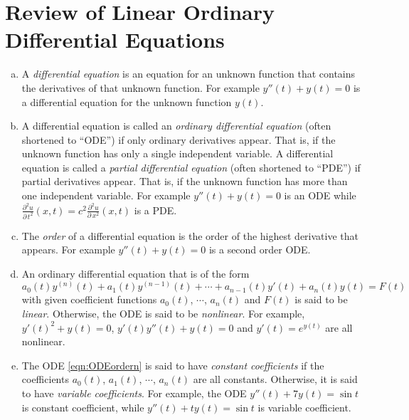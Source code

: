 \graphicspath{{figures/ode/}}

\renewcommand{\theequation}{\thechapter.\arabic{equation}}
\renewcommand{\thetheorem}{\thechapter.\arabic{theorem}}
\renewcommand{\thebc}{\thechapter.\arabic{theorem}}
\renewcommand{\theeg}{\thechapter.\arabic{theorem}}


\chapter{Review of Linear Ordinary Differential Equations}\label{ap:ODE}


\begin{defn}\label{def:apODE}
\begin{enumerate}[(a)]
\item %
A \emph{differential equation} is an equation for an
unknown function that contains the derivatives of that unknown function.
For example $y''(t)+y(t)=0$ is a differential equation for the unknown 
function $y(t)$.

\item %
A differential equation is called an \emph{ordinary differential
equation} (often shortened to ``ODE'') if only ordinary derivatives 
appear. That is, if the unknown function has only a single independent
variable. A differential equation is called a \emph{partial differential
equation} (often shortened to ``PDE'') if partial derivatives 
appear. That is, if the unknown function has more than one independent
variable. For example $y''(t)+y(t)=0$ is an ODE while
$\frac{\partial^2 u}{\partial\, t^2}(x,t)=c^2 
\frac{\partial^2 u}{\partial\, x^2}(x,t)$ is a PDE.

\item %
The \emph{order} of a differential equation is the order of the
highest derivative that appears. For example $y''(t)+y(t)=0$ 
is a second order ODE.

\item %
An ordinary differential equation that is of the form
\begin{equation}\label{eqn:ODEordern}
a_0(t) y^{(n)}(t) + a_1(t) y^{(n-1)}(t)+\cdots+a_{n-1}(t) y'(t) +a_n(t)y(t)
=F(t)
\end{equation}
with given coefficient functions $a_0(t)$, $\cdots$, $a_n(t)$ and $F(t)$ 
is said to be \emph{linear}. Otherwise, the ODE is said to be \emph{nonlinear}.
For example, $y'(t)^2+y(t)=0$, $y'(t)y''(t)+y(t)=0$ and $y'(t)=e^{y(t)}$
are all nonlinear.

\item %
The ODE \eqref{eqn:ODEordern} is said to have \emph{constant coefficients} if
the coefficients  $a_0(t)$, $a_1(t)$, $\cdots$, $a_n(t)$ are all constants. Otherwise,
it is said to have \emph{variable coefficients}. For example,
the ODE $y''(t)+7y(t)=\sin t$ is constant coefficient, while 
$y''(t)+ty(t)=\sin t$ is variable coefficient.


\end{enumerate}
\end{defn}


